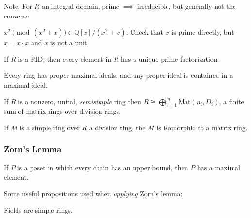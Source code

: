 Note: For \(R\) an integral domain, prime \(\implies\) irreducible, but
generally not the converse.

\(x^2 \pmod(x^2 + x) \in {\mathbb{Q}}[x]/(x^2 + x)\). Check that \(x\)
is prime directly, but \(x=x\cdot x\) and \(x\) is not a unit.

\begin{proposition}

If \(R\) is a PID, then every element in \(R\) has a unique prime
factorization.

\end{proposition}

\begin{theorem}[Krull]

Every ring has proper maximal ideals, and any proper ideal is contained
in a maximal ideal.

\end{theorem}

\begin{theorem}

If \(R\) is a nonzero, unital, \emph{semisimple} ring then
\(R \cong \bigoplus_{i=1}^m \mathrm{Mat}(n_i, D_i)\), a finite sum of
matrix rings over division rings.

\end{theorem}

\begin{corollary}

If \(M\) is a simple ring over \(R\) a division ring, the \(M\) is
isomorphic to a matrix ring.

\end{corollary}

\hypertarget{zorns-lemma}{%
\subsubsection{Zorn's Lemma}\label{zorns-lemma}}

\begin{theorem}

If \(P\) is a poset in which every chain has an upper bound, then \(P\)
has a maximal element.

\end{theorem}

Some useful propositions used when \emph{applying} Zorn's lemma:

\begin{proposition}

Fields are simple rings.

\end{proposition}

